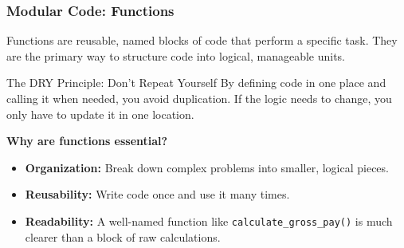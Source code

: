 \documentclass{beamer}
\begin{document}
\begin{frame}[fragile]
    \frametitle{Modular Code: Functions}
    
    Functions are reusable, named blocks of code that perform a specific task. They are the primary way to structure code into logical, manageable units.
    
    \begin{block}{The DRY Principle: Don't Repeat Yourself}
        By defining code in one place and calling it when needed, you avoid duplication. If the logic needs to change, you only have to update it in one location.
    \end{block}
    
    \textbf{Why are functions essential?}
    \begin{itemize}
        \item \textbf{Organization:} Break down complex problems into smaller, logical pieces.
        \item \textbf{Reusability:} Write code once and use it many times.
        \item \textbf{Readability:} A well-named function like \texttt{calculate\_gross\_pay()} is much clearer than a block of raw calculations.
    \end{itemize}
    
\end{frame}
\end{document}
